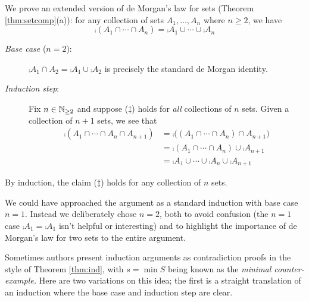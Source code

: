 

\goodbreak


\begin{example}{}{}
	We prove an extended version of de Morgan's law for sets (Theorem \ref{thm:setcomp}(a)): for any collection of sets $A_1,\ldots,A_n$ where $n\ge 2$, we have
	\[
	 	\comp{(A_1\cap \cdots\cap A_n)}=\comp{A_1}\cup\cdots\cup\comp{A_n} \tag{$\ddag$}
	\]
	\begin{description}
		\item[\normalfont\emph{Base case} ($n=2$):] $\comp{A_1\cap A_2}=\comp{A_1}\cup\comp{A_2}$ is precisely the standard de Morgan identity.
		\item[\normalfont\emph{Induction step}:] Fix $n\in\mathbb{N}_{\ge 2}$ and suppose ($\ddag$) holds for \emph{all} collections of $n$ sets. Given a collection of $n+1$ sets, we see that
		\begin{align*}
			\comp{(A_1\cap \cdots\cap A_n\cap A_{n+1})}
			&=\comp{\bigl((A_1\cap \cdots\cap A_n)\cap A_{n+1}\bigr)}\\
			&=\comp{(A_1\cap \cdots\cap A_n)}\cup \comp{A_{n+1}} \tag{de Morgan again!}\\
			&=\comp{A_1}\cup\cdots\cup\comp{A_n}\cup\comp{A_{n+1}} \tag{induction hypothesis}
		\end{align*}
	\end{description}
	By induction, the claim ($\ddag$) holds for any collection of $n$ sets.
\end{example}

We could have approached the argument as a standard induction with base case $n=1$. Instead we deliberately chose $n=2$, both to avoid confusion (the $n=1$ case $\comp{A_1}=\comp{A_1}$ isn't helpful or interesting) and to highlight the importance of de Morgan's law for two sets to the entire argument.



Sometimes authors present induction arguments as contradiction proofs in the style of Theorem \ref{thm:ind}, with $s=\min S$ being known as the \emph{minimal counter-example.} Here are two variations on this idea; the first is a straight translation of an induction where the base case and induction step are clear.

